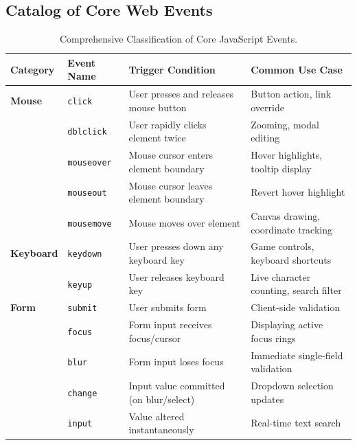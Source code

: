 \subsection{Catalog of Core Web Events}

\begin{table}[htbp]
\centering
\small
\renewcommand{\arraystretch}{1.2}
\begin{tabularx}{\linewidth}{lllX}
\toprule
\textbf{Category} & \textbf{Event Name} & \textbf{Trigger Condition} & \textbf{Common Use Case} \\
\midrule
\textbf{Mouse} & \texttt{click} & User presses and releases mouse button & Button action, link override \\
& \texttt{dblclick} & User rapidly clicks element twice & Zooming, modal editing \\
& \texttt{mouseover} & Mouse cursor enters element boundary & Hover highlights, tooltip display \\
& \texttt{mouseout} & Mouse cursor leaves element boundary & Revert hover highlight \\
& \texttt{mousemove} & Mouse moves over element & Canvas drawing, coordinate tracking \\
\midrule
\textbf{Keyboard} & \texttt{keydown} & User presses down any keyboard key & Game controls, keyboard shortcuts \\
& \texttt{keyup} & User releases keyboard key & Live character counting, search filter \\
\midrule
\textbf{Form} & \texttt{submit} & User submits form & Client-side validation \\
& \texttt{focus} & Form input receives focus/cursor & Displaying active focus rings \\
& \texttt{blur} & Form input loses focus & Immediate single-field validation \\
& \texttt{change} & Input value committed (on blur/select) & Dropdown selection updates \\
& \texttt{input} & Value altered instantaneously & Real-time text search \\
\bottomrule
\end{tabularx}
\caption{Comprehensive Classification of Core JavaScript Events.}
\label{tab:events-catalog}
\end{table}


